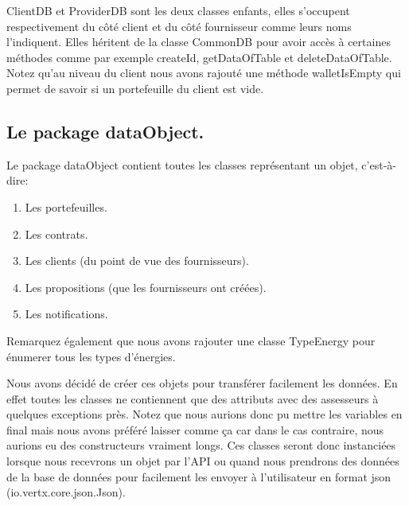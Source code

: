\begin{flushleft}
ClientDB et ProviderDB sont les deux classes enfants, elles s'occupent respectivement du côté client et du côté fournisseur comme leurs noms l'indiquent. Elles héritent de la classe CommonDB pour avoir accès à certaines méthodes comme par exemple createId, getDataOfTable et deleteDataOfTable. Notez qu'au niveau du client nous avons rajouté une méthode walletIsEmpty qui permet de savoir si un portefeuille du client est vide.
\end{flushleft}

\subsection{Le package dataObject.}

\begin{flushleft}
Le package dataObject contient toutes les classes représentant un objet, c'est-à-dire:
\end{flushleft}

\begin{enumerate}[-]
\item Les portefeuilles.
\item Les contrats.
\item Les clients (du point de vue des fournisseurs).
\item Les propositions (que les fournisseurs ont créées).
\item Les notifications.
\end{enumerate}

\begin{flushleft}
Remarquez également que nous avons rajouter une classe TypeEnergy pour énumerer tous les types d'énergies.
\end{flushleft}

\begin{flushleft}
Nous avons décidé de créer ces objets pour transférer facilement les données. En effet toutes les classes ne contiennent que des attributs avec des assesseurs à quelques exceptions près. Notez que nous aurions donc pu mettre les variables en final mais nous avons préféré laisser comme ça car dans le cas contraire, nous aurions eu des constructeurs vraiment longs. Ces classes seront donc instanciées lorsque nous recevrons un objet par l'API ou quand nous prendrons des données de la base de données pour facilement les envoyer à l'utilisateur en format json (io.vertx.core.json.Json).
\end{flushleft}

